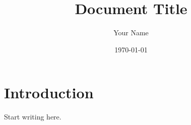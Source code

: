 \documentclass[11pt]{article}
\title{Document Title}
\author{Your Name}
\date{\today}
\begin{document}
\maketitle

\section{Introduction}

Start writing here.
\end{document}
